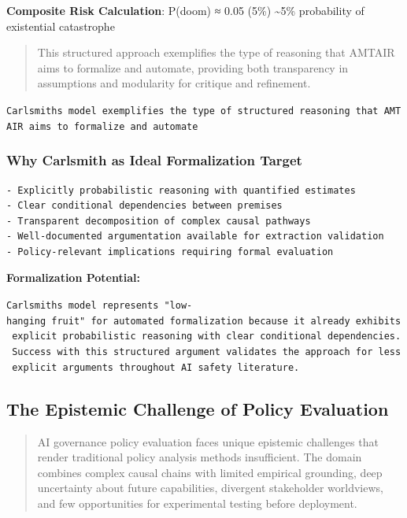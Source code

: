 \documentclass[
  11pt,
  letterpaper,
]{book}
\begin{document}
\textbf{Composite Risk Calculation}: P(doom) ≈ 0.05 (5\%)
\textasciitilde5\% probability of existential catastrophe

\begin{quote}
This structured approach exemplifies the type of reasoning that AMTAIR
aims to formalize and automate, providing both transparency in
assumptions and modularity for critique and refinement.
\end{quote}

\texttt{Carlsmith\textquotesingle{}s\ model\ exemplifies\ the\ type\ of\ structured\ reasoning\ that\ AMTAIR\ aims\ to\ formalize\ and\ automate}

\subsubsection{Why Carlsmith as Ideal Formalization
Target}\label{sec-carlsmith-ideal}

\begin{verbatim}
- Explicitly probabilistic reasoning with quantified estimates
- Clear conditional dependencies between premises  
- Transparent decomposition of complex causal pathways
- Well-documented argumentation available for extraction validation
- Policy-relevant implications requiring formal evaluation
\end{verbatim}

\textbf{Formalization Potential:}

\texttt{Carlsmith\textquotesingle{}s\ model\ represents\ "low-hanging\ fruit"\ for\ automated\ formalization\ because\ it\ already\ exhibits\ explicit\ probabilistic\ reasoning\ with\ clear\ conditional\ dependencies.\ Success\ with\ this\ structured\ argument\ validates\ the\ approach\ for\ less\ explicit\ arguments\ throughout\ AI\ safety\ literature.}

\subsection{The Epistemic Challenge of Policy
Evaluation}\label{sec-epistemic-challenge}

\begin{quote}
AI governance policy evaluation faces unique epistemic challenges that
render traditional policy analysis methods insufficient. The domain
combines complex causal chains with limited empirical grounding, deep
uncertainty about future capabilities, divergent stakeholder worldviews,
and few opportunities for experimental testing before deployment.
\end{quote}
\end{document}
